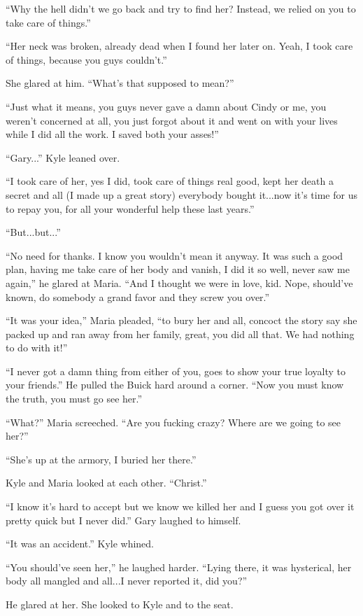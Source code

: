 ``Why the hell didn't we go back and try to find her? Instead, we relied
on you to take care of things.''

``Her neck was broken, already dead when I found her later on. Yeah, I
took care of things, because you guys couldn't.''

She glared at him. ``What's that supposed to mean?''

``Just what it means, you guys never gave a damn about Cindy or me, you
weren't concerned at all, you just forgot about it and went on with your
lives while I did all the work. I saved both your asses!''

``Gary...'' Kyle leaned over.

``I took care of her, yes I did, took care of things real good, kept her
death a secret and all (I made up a great story) everybody bought
it...now it's time for us to repay you, for all your wonderful help
these last years.''

``But...but...''

``No need for thanks. I know you wouldn't mean it anyway. It was such a
good plan, having me take care of her body and vanish, I did it so well,
never saw me again,'' he glared at Maria. ``And I thought we were in
love, kid. Nope, should've known, do somebody a grand favor and they
screw you over.''

``It was your idea,'' Maria pleaded, ``to bury her and all, concoct the
story say she packed up and ran away from her family, great, you did all
that. We had nothing to do with it!''

``I never got a damn thing from either of you, goes to show your true
loyalty to your friends.'' He pulled the Buick hard around a corner.
``Now you must know the truth, you must go see her.''

``What?'' Maria screeched. ``Are you fucking crazy? Where are we going
to see her?''

``She's up at the armory, I buried her there.''

Kyle and Maria looked at each other. ``Christ.''

``I know it's hard to accept but we know we killed her and I guess you
got over it pretty quick but I never did.'' Gary laughed to himself.

``It was an accident.'' Kyle whined.

``You should've seen her,'' he laughed harder. ``Lying there, it was
hysterical, her body all mangled and all...I never reported it, did
you?''

He glared at her. She looked to Kyle and to the seat.

